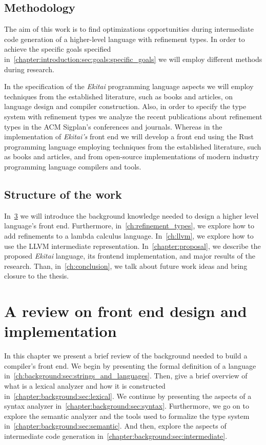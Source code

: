 \documentclass[
  oneside,
  english,
  coorientadorbanca,
  noabntexcite
]{ufsc-thesis-rn46-2019}
\begin{document}
\section{Methodology}

The aim of this work is to find optimizations opportunities during intermediate code generation of a higher-level language with refinement types.
In order to achieve the specific goals specified in~\cref{chapter:introduction:sec:goals:specific_goals} we will employ different methods during research.

In the specification of the \textit{Ekitai} programming language aspects we will employ techniques from the established literature, such as books and articles, on language design and compiler construction.
Also, in order to specify the type system with refinement types we analyze the recent publications about refinement types in the ACM Sigplan's conferences and journals.
Whereas in the implementation of \textit{Ekitai's} front end we will develop a front end using the Rust programming language employing techniques from the established literature, such as books and articles, and from open-source implementations of modern industry programming language compilers and tools.

\section{Structure of the work}

In~\cref{chapter:background} we will introduce the background knowledge needed to design a higher level language's front end.
Furthermore, in~\cref{ch:refinement_types}, we explore how to add refinements to a lambda calculus language.
In~\cref{ch:llvm}, we explore how to use the LLVM intermediate representation.
In~\cref{chapter:proposal}, we describe the proposed \textit{Ekitai} language, its frontend implementation, and major results of the research.
Than, in~\cref{ch:conclusion}, we talk about future work ideas and bring closure to the thesis.

\chapter{A review on front end design and implementation}\label{chapter:background}

In this chapter we present a brief review of the background needed to build a compiler's front end.
We begin by presenting the formal definition of a language in~\cref{ch:background:sec:strings_and_languages}.
Then, give a brief overview of what is a lexical analyzer and how it is constructed in~\cref{chapter:background:sec:lexical}.
We continue by presenting the aspects of a syntax analyzer in~\cref{chapter:background:sec:syntax}.
Furthermore, we go on to explore the semantic analyzer and the tools used to formalize the type system in~\cref{chapter:background:sec:semantic}.
And then, explore the aspects of intermediate code generation in~\cref{chapter:background:sec:intermediate}.
\end{document}
